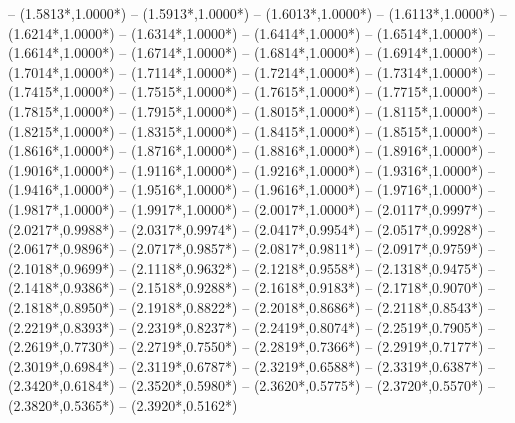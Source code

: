 {	-- ({1.5813*\dx},{1.0000*\dy})
	-- ({1.5913*\dx},{1.0000*\dy})
	-- ({1.6013*\dx},{1.0000*\dy})
	-- ({1.6113*\dx},{1.0000*\dy})
	-- ({1.6214*\dx},{1.0000*\dy})
	-- ({1.6314*\dx},{1.0000*\dy})
	-- ({1.6414*\dx},{1.0000*\dy})
	-- ({1.6514*\dx},{1.0000*\dy})
	-- ({1.6614*\dx},{1.0000*\dy})
	-- ({1.6714*\dx},{1.0000*\dy})
	-- ({1.6814*\dx},{1.0000*\dy})
	-- ({1.6914*\dx},{1.0000*\dy})
	-- ({1.7014*\dx},{1.0000*\dy})
	-- ({1.7114*\dx},{1.0000*\dy})
	-- ({1.7214*\dx},{1.0000*\dy})
	-- ({1.7314*\dx},{1.0000*\dy})
	-- ({1.7415*\dx},{1.0000*\dy})
	-- ({1.7515*\dx},{1.0000*\dy})
	-- ({1.7615*\dx},{1.0000*\dy})
	-- ({1.7715*\dx},{1.0000*\dy})
	-- ({1.7815*\dx},{1.0000*\dy})
	-- ({1.7915*\dx},{1.0000*\dy})
	-- ({1.8015*\dx},{1.0000*\dy})
	-- ({1.8115*\dx},{1.0000*\dy})
	-- ({1.8215*\dx},{1.0000*\dy})
	-- ({1.8315*\dx},{1.0000*\dy})
	-- ({1.8415*\dx},{1.0000*\dy})
	-- ({1.8515*\dx},{1.0000*\dy})
	-- ({1.8616*\dx},{1.0000*\dy})
	-- ({1.8716*\dx},{1.0000*\dy})
	-- ({1.8816*\dx},{1.0000*\dy})
	-- ({1.8916*\dx},{1.0000*\dy})
	-- ({1.9016*\dx},{1.0000*\dy})
	-- ({1.9116*\dx},{1.0000*\dy})
	-- ({1.9216*\dx},{1.0000*\dy})
	-- ({1.9316*\dx},{1.0000*\dy})
	-- ({1.9416*\dx},{1.0000*\dy})
	-- ({1.9516*\dx},{1.0000*\dy})
	-- ({1.9616*\dx},{1.0000*\dy})
	-- ({1.9716*\dx},{1.0000*\dy})
	-- ({1.9817*\dx},{1.0000*\dy})
	-- ({1.9917*\dx},{1.0000*\dy})
	-- ({2.0017*\dx},{1.0000*\dy})
	-- ({2.0117*\dx},{0.9997*\dy})
	-- ({2.0217*\dx},{0.9988*\dy})
	-- ({2.0317*\dx},{0.9974*\dy})
	-- ({2.0417*\dx},{0.9954*\dy})
	-- ({2.0517*\dx},{0.9928*\dy})
	-- ({2.0617*\dx},{0.9896*\dy})
	-- ({2.0717*\dx},{0.9857*\dy})
	-- ({2.0817*\dx},{0.9811*\dy})
	-- ({2.0917*\dx},{0.9759*\dy})
	-- ({2.1018*\dx},{0.9699*\dy})
	-- ({2.1118*\dx},{0.9632*\dy})
	-- ({2.1218*\dx},{0.9558*\dy})
	-- ({2.1318*\dx},{0.9475*\dy})
	-- ({2.1418*\dx},{0.9386*\dy})
	-- ({2.1518*\dx},{0.9288*\dy})
	-- ({2.1618*\dx},{0.9183*\dy})
	-- ({2.1718*\dx},{0.9070*\dy})
	-- ({2.1818*\dx},{0.8950*\dy})
	-- ({2.1918*\dx},{0.8822*\dy})
	-- ({2.2018*\dx},{0.8686*\dy})
	-- ({2.2118*\dx},{0.8543*\dy})
	-- ({2.2219*\dx},{0.8393*\dy})
	-- ({2.2319*\dx},{0.8237*\dy})
	-- ({2.2419*\dx},{0.8074*\dy})
	-- ({2.2519*\dx},{0.7905*\dy})
	-- ({2.2619*\dx},{0.7730*\dy})
	-- ({2.2719*\dx},{0.7550*\dy})
	-- ({2.2819*\dx},{0.7366*\dy})
	-- ({2.2919*\dx},{0.7177*\dy})
	-- ({2.3019*\dx},{0.6984*\dy})
	-- ({2.3119*\dx},{0.6787*\dy})
	-- ({2.3219*\dx},{0.6588*\dy})
	-- ({2.3319*\dx},{0.6387*\dy})
	-- ({2.3420*\dx},{0.6184*\dy})
	-- ({2.3520*\dx},{0.5980*\dy})
	-- ({2.3620*\dx},{0.5775*\dy})
	-- ({2.3720*\dx},{0.5570*\dy})
	-- ({2.3820*\dx},{0.5365*\dy})
	-- ({2.3920*\dx},{0.5162*\dy})
}
